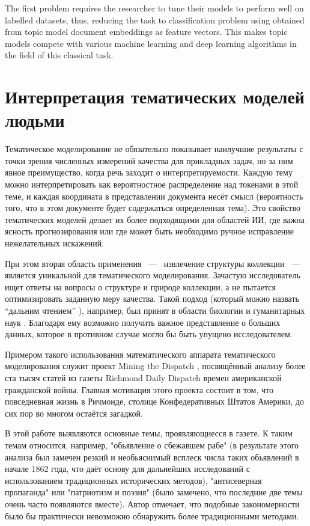 The first problem requires the researcher to tune their models to perform well on labelled datasets, thus, reducing the task to classification problem using obtained from topic model document embeddings as feature vectors. This makes topic models compete with various machine learning and deep learning algorithms in the field of this classical task. 

\section{Интерпретация тематических моделей людьми}

Тематическое моделирование не обязательно показывает наилучшие результаты с точки зрения численных измерений качества для прикладных задач, но за ним явное преимущество, когда речь заходит о интерпретируемости. Каждую тему можно интерпретировать как вероятностное распределение над токенами в этой теме, и каждая координата в представлении документа несёт смысл (вероятность того, что в этом документе будет содержаться определенная тема). Это свойство тематических моделей делает их более подходящими для областей ИИ, где важна ясность прогнозирования или где может быть необходимо ручное исправление нежелательных искажений.

При этом вторая область применения ~---~ извлечение структуры коллекции ~---~ является уникальной для тематического моделирования. Зачастую исследователь ищет ответы на вопросы о структуре и природе коллекции, а не пытается оптимизировать заданную меру качества. Такой подход (который можно назвать ``дальним чтением'' \cite{milkova2019distant}), например, был принят в области биологии \cite{Liu2016,funnell2019integrated} и гуманитарных наук \cite{fntir,antons2019content}. Благодаря ему возможно получить важное представление о больших данных, которое в противном случае могло бы быть упущено исследователем.

Примером такого использования математического аппарата тематического моделирования служит проект  Mining the Dispatch \cite{dispatch}, посвящённый анализу более ста тысяч статей из газеты Richmond Daily Dispatch времен американской гражданской войны. Главная мотивация этого проекта состоит в том, что повседневная жизнь в Ричмонде, столице Конфедеративных Штатов Америки, до сих пор во многом остаётся загадкой.

В этой работе выявляются основные темы, проявляющиесся в газете. К таким темам относится, например, "обьявление о сбежавшем рабе" (в результате этого анализа был замечен резкий и необьяснимый всплеск числа таких обьявлений в начале 1862 года, что даёт основу для дальнейших исследований с использованием традиционных исторических методов), "антисеверная пропаганда" или "патриотизм и поэзия" (было замечено, что последние две темы очень часто появляются вместе). Автор отмечает, что подобные закономерности было бы практически невозможно обнаружить более традиционными методами.

